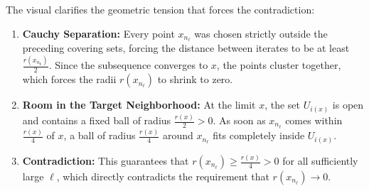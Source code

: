 \begin{proofWrapper}
\begin{content}
\begin{center}
\end{center}

\begin{steps}
The visual clarifies the geometric tension that forces the contradiction:
\begin{enumerate}[label=\textbf{(\arabic*)}]
    \setcounter{enumi}{0}
    \item \textbf{Cauchy Separation:} Every point $x_{n_\ell}$ was chosen strictly outside the preceding covering sets, forcing the distance between iterates to be at least $\frac{r(x_{n_k})}{2}$. Since the subsequence converges to $x$, the points cluster together, which forces the radii $r(x_{n_\ell})$ to shrink to zero.
    \item \textbf{Room in the Target Neighborhood:} At the limit $x$, the set $U_{i(x)}$ is open and contains a fixed ball of radius $\frac{r(x)}{2} > 0$. As soon as $x_{n_\ell}$ comes within $\frac{r(x)}{4}$ of $x$, a ball of radius $\frac{r(x)}{4}$ around $x_{n_\ell}$ fits completely inside $U_{i(x)}$.
    \item \textbf{Contradiction:} This guarantees that $r(x_{n_\ell}) \ge \frac{r(x)}{4} > 0$ for all sufficiently large $\ell$, which directly contradicts the requirement that $r(x_{n_\ell}) \to 0$.
\end{enumerate}
\end{steps}
\end{content}

\end{proofWrapper}

